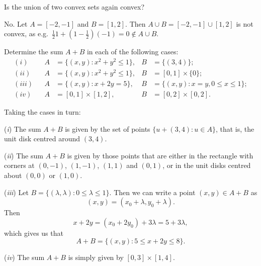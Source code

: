 \begin{exercise}
  Is the union of two convex sets again convex?
\end{exercise}

\begin{solution}
  No.
  Let $A = [-2, -1]$ and $B = [1, 2]$.
  Then $A \cup B = [-2, -1] \cup [1, 2]$ is not convex, as e.g.\ $\tfrac{1}{2} 1 + (1 - \tfrac{1}{2}) (-1) = 0 \notin A \cup B$.
\end{solution}

\begin{exercise}
  Determine the sum $A + B$ in each of the following cases:
  \begin{align*}
    (i) && A &= \{ (x, y) : x^2 + y^2 \leq 1 \}, & B &= \{ (3, 4) \}; \\
    (ii) && A &= \{ (x, y) : x^2 + y^2 \leq 1 \}, & B &= [0, 1] \times \{0\}; \\
    (iii) && A &= \{ (x, y) : x + 2y = 5 \}, & B &= \{ (x, y) : x = y, 0 \leq x \leq 1 \}; \\
    (iv) && A &= [0, 1] \times [1, 2], & B &= [0, 2] \times [0, 2].
  \end{align*}
\end{exercise}

\begin{solution}
  Taking the cases in turn:

  (\emph{i}) The sum $A + B$ is given by the set of points $\{ u + (3, 4) : u \in A \}$, that is, the unit disk centred around $(3, 4)$.

  (\emph{ii}) The sum $A + B$ is given by those points that are either in the rectangle with corners at $(0,-1)$, $(1, -1)$, $(1, 1)$ and $(0, 1)$, or in the unit disks centred about $(0,0)$ or $(1, 0)$.

  (\emph{iii}) Let $B = \{ (\lambda, \lambda) : 0 \leq \lambda \leq 1 \}$.
  Then we can write a point $(x, y) \in A + B$ as
  \begin{equation}
    (x, y) = (x_0 + \lambda, y_0 + \lambda).
  \end{equation}
  Then
  \begin{equation}
    x + 2y = (x_0 + 2y_0) + 3 \lambda = 5 + 3\lambda,
  \end{equation}
  which gives us that
  \begin{equation}
    A + B = \{ (x, y) : 5 \leq x + 2y \leq 8 \}.
  \end{equation}

  (\emph{iv}) The sum $A + B$ is simply given by $[0, 3] \times [1, 4]$.
\end{solution}

